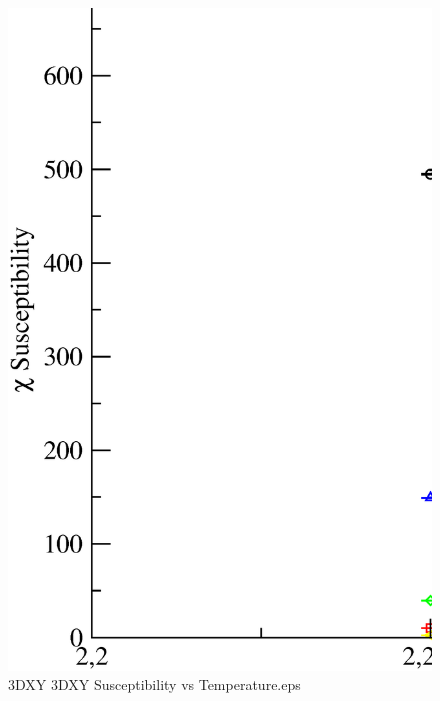 \begin{figure}[!htpb]
  \centering
  \includegraphics[width=\textwidth]{./plots/3DXY/3DXY_Susceptibility_vs_Temperature.eps}
  \caption{3DXY 3DXY Susceptibility vs Temperature.eps}
\end{figure}

